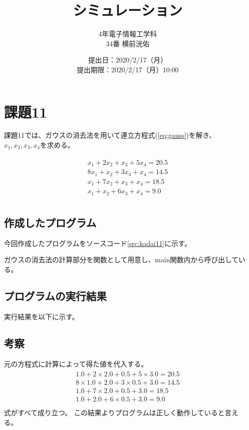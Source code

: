 \documentclass[11pt,titlepage]{jsarticle}
\title{シミュレーション}
\author{4年電子情報工学科\\34番 横前洸佑}
\date{提出日：2020/2/17（月）\\	提出期限：2020/2/17（月）10:00}
\begin{document}
\maketitle

\section{課題11}
課題11では、ガウスの消去法を用いて連立方程式(\ref{eq:gauss})を解き、$x_1, x_2, x_3, x_4$を求める。


\begin{eqnarray}
\label{eq:gauss}
		\begin{array}{l}
			x_1 + 2x_2 + x_3 + 5x_4 = 20.5\\
			8x_1 + x_2 + 3x_3 + x_4 = 14.5\\
			x_1 + 7x_2 + x_3 + x_4 = 18.5\\
			x_1 + x_2 + 6x_3 + x_4 = 9.0\\
		\end{array}
\end{eqnarray}

\subsection{作成したプログラム}
今回作成したプログラムをソースコード\ref{src:kadai11}に示す。


ガウスの消去法の計算部分を関数として用意し、main関数内から呼び出している。

\subsection{プログラムの実行結果}
実行結果を以下に示す。
\begin{oframed}
\end{oframed}

\subsection{考察}
元の方程式に計算によって得た値を代入する。
\begin{eqnarray}
\label{eq:gauss_result}
		\begin{array}{l}
			1.0 + 2\times2.0 + 0.5 + 5\times3.0 = 20.5\\
			8\times1.0 + 2.0 + 3\times0.5 + 3.0 = 14.5\\
			1.0 + 7\times2.0 + 0.5 + 3.0 = 18.5\\
			1.0 + 2.0 + 6\times0.5 + 3.0 = 9.0\\
		\end{array}
\end{eqnarray}
式がすべて成り立つ。
この結果よりプログラムは正しく動作していると言える。
\end{document}
